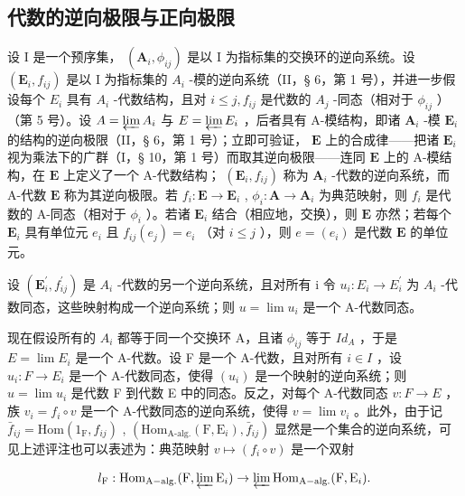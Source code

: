 \subsection{代数的逆向极限与正向极限}

设 I 是一个预序集， \((\mathbf{A}_{i},\phi_{ij})\) 是以 I 为指标集的交换环的逆向系统。设 \((\mathbf{E}_{i},f_{ij})\) 是以 I 为指标集的 \(A_{i}\) -模的逆向系统（II，§ 6，第 1 号），并进一步假设每个 \(E_{i}\) 具有 \(A_{i}\) -代数结构，且对 \(i\leqslant j,f_{ij}\) 是代数的 \(A_{j}\) -同态（相对于 \(\phi_{ij}\) ）（第 5 号）。设 \(A=\varprojlim A_{i}\) 与 \(E=\varprojlim E_{i}\) ，后者具有 A-模结构，即诸 \(\mathbf{A}_i\) -模 \(\mathbf{E}_i\) 的结构的逆向极限（II，§ 6，第 1 号）；立即可验证， \(\mathbf{E}\) 上的合成律——把诸 \(\mathbf{E}_i\) 视为乘法下的广群（I，§ 10，第 1 号）而取其逆向极限——连同 \(\mathbf{E}\) 上的 A-模结构，在 \(\mathbf{E}\) 上定义了一个 A-代数结构； \((\mathbf{E}_i, f_{ij})\) 称为 \(\mathbf{A}_i\) -代数的逆向系统，而 A-代数 \(\mathbf{E}\) 称为其逆向极限。若 \(f_i: \mathbf{E} \to \mathbf{E}_i\) , \(\phi_i: \mathbf{A} \to \mathbf{A}_i\) 为典范映射，则 \(f_i\) 是代数的 A-同态（相对于 \(\phi_i\) ）。若诸 \(\mathbf{E}_i\) 结合（相应地，交换），则 \(\mathbf{E}\) 亦然；若每个 \(\mathbf{E}_i\) 具有单位元 \(e_i\) 且 \(f_{ij}(e_j) = e_i\) （对 \(i \leqslant j\) ），则 \(e = (e_i)\) 是代数 \(\mathbf{E}\) 的单位元。

设 \((\mathbf{E}_{i}^{\prime}, f_{ij}^{\prime})\) 是 \(A_{i}\) -代数的另一个逆向系统，且对所有 i 令 \(u_{i}: E_{i} \to E_{i}^{\prime}\) 为 \(A_{i}\) -代数同态，这些映射构成一个逆向系统；则 \(u = \lim u_{i}\) 是一个 A-代数同态。

现在假设所有的 \(A_{i}\) 都等于同一个交换环 A，且诸 \(\phi_{ij}\) 等于 \(Id_{A}\) ，于是 \(E = \lim E_{i}\) 是一个 A-代数。设 F 是一个 A-代数，且对所有 \(i \in I\) ，设 \(u_{i}: F \to E_{i}\) 是一个 A-代数同态，使得 \((u_{i})\) 是一个映射的逆向系统；则 \(u = \lim u_{i}\) 是代数 F 到代数 E 中的同态。反之，对每个 A-代数同态 \(v: F \to E\) ，族 \(v_{i} = f_{i} \circ v\) 是一个 A-代数同态的逆向系统，使得 \(v = \lim v_{i}\) 。此外，由于记 \(\bar{f}_{ij} = \text{Hom}(1_{\text{F}}, f_{ij})\) , \((\text{Hom}_{\text{A-alg.}}(\text{F}, \text{E}_i), \bar{f}_{ij})\) 显然是一个集合的逆向系统，可见上述评注也可以表述为：典范映射 \(v \mapsto (f_i \circ v)\) 是一个双射

\[
l _ {\mathrm{F}}: \operatorname{Hom} _ {\mathrm{A-alg.}} (\mathrm{F}, \varprojlim \mathrm{E} _ {i}) \rightarrow \varprojlim \operatorname{Hom} _ {\mathrm{A-alg.}} (\mathrm{F}, \mathrm{E} _ {i}).
\]

